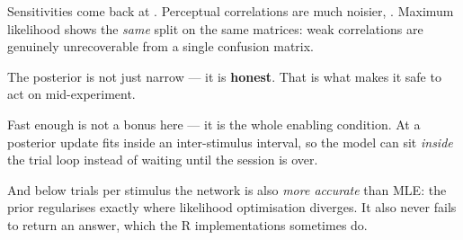 \documentclass[final]{article}
\newlength{\colw}
\begin{document}
\begin{minipage}[t]{\colw}


{\bodyfont
Sensitivities come back at . Perceptual correlations are
much noisier, . Maximum likelihood shows the \emph{same}
split on the same matrices: weak correlations are genuinely unrecoverable from
a single confusion matrix.
\par}


{\bodyfont
The posterior is not just narrow --- it is \textbf{honest}. That is what makes
it safe to act on mid-experiment.
\par}
\end{minipage}%
\hfill
\begin{minipage}[t]{\colw}



{\bodyfont
Fast enough is not a bonus here --- it is the whole enabling condition. At
 a posterior update fits inside an inter-stimulus
interval, so the model can sit \emph{inside} the trial loop instead of waiting
until the session is over.

And below  trials per stimulus the network is also \emph{more
accurate} than MLE: the prior regularises exactly where likelihood
optimisation diverges. It also never fails to return an answer, which the R
implementations sometimes do.
\par}
\end{minipage}%
\hfill
\end{document}
